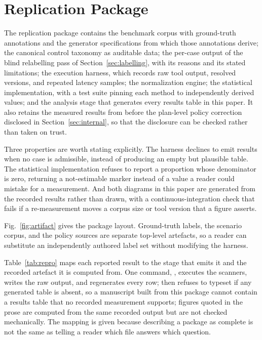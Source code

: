 \documentclass[smallextended]{svjour3}
\begin{document}
\section{Replication Package}
\label{sec:replication}

The replication package contains the benchmark corpus with ground-truth
annotations and the generator specifications from which those annotations derive;
the canonical control taxonomy as auditable data; the per-case output of the blind
relabelling pass of Section~\ref{sec:labelling}, with its reasons and its stated
limitations; the execution harness, which records raw tool output, resolved
versions, and repeated latency samples; the normalization engine; the statistical
implementation, with a test suite pinning each method to independently derived
values; and the analysis stage that generates every results table in this paper. It also
retains the measured results from before the plan-level policy correction
disclosed in Section~\ref{sec:internal}, so that the disclosure can be checked
rather than taken on trust.

Three properties are worth stating explicitly. The harness declines to emit
results when no case is admissible, instead of producing an empty but plausible
table. The statistical implementation refuses to report a proportion whose
denominator is zero, returning a not-estimable marker instead of a value a reader
could mistake for a measurement. And both diagrams in this paper are generated
from the recorded results rather than drawn, with a continuous-integration check
that fails if a re-measurement moves a corpus size or tool version that a figure
asserts.

Fig.~\ref{fig:artifact} gives the package layout. Ground-truth labels, the
scenario corpus, and the policy sources are separate top-level artefacts, so a
reader can substitute an independently authored label set without modifying the
harness.

Table~\ref{tab:repro} maps each reported result to the stage that emits it and the
recorded artefact it is computed from. One command,
, executes the scanners, writes the raw output,
and regenerates every row;  then refuses to typeset if any
generated table is absent, so a manuscript built from this package cannot contain a
results table that no recorded measurement supports; figures quoted in the prose
are computed from the same recorded output but are not checked mechanically. The mapping is given because
describing a package as complete is not the same as telling a reader which file
answers which question.
\end{document}
